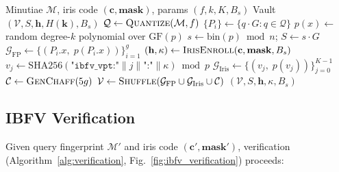 \documentclass[conference]{IEEEtran}
\newcommand{\IBFV}{\textsf{IBFV}}
\newcommand{\GFp}{\mathrm{GF}(p)}
\begin{document}
\begin{algorithm}[t]
\caption{\IBFV{} Enrollment}
\label{alg:enrollment}
\begin{algorithmic}[1]
\REQUIRE Minutiae $\mathcal{M}$, iris code $(\mathbf{c}, \mathbf{mask})$, params $(f, k, K, B_s)$
\ENSURE Vault $(\mathcal{V}, S, \mathbf{h}, H(\mathbf{k}), B_s)$
\STATE $\mathcal{Q} \leftarrow \textsc{Quantize}(\mathcal{M}, f)$
\STATE $\{P_i\} \leftarrow \{q \cdot G : q \in \mathcal{Q}\}$ 
\STATE $p(x) \leftarrow$ random degree-$k$ polynomial over $\GFp{}$
\STATE $s \leftarrow \text{bin}(p) \bmod n$; $S \leftarrow s \cdot G$
\STATE $\mathcal{G}_\text{FP} \leftarrow \{(P_i.x,\; p(P_i.x))\}_{i=1}^{g}$
\STATE $(\mathbf{h}, \kappa) \leftarrow \textsc{IrisEnroll}(\mathbf{c}, \mathbf{mask}, B_s)$
    \STATE $v_j \leftarrow \text{SHA256}(\texttt{"ibfv\_vpt:"} \| j \| \texttt{":"} \| \kappa) \bmod p$
\ENDFOR
\STATE $\mathcal{G}_\text{Iris} \leftarrow \{(v_j,\; p(v_j))\}_{j=0}^{K-1}$
\STATE $\mathcal{C} \leftarrow \textsc{GenChaff}(5g)$ 
\STATE $\mathcal{V} \leftarrow \textsc{Shuffle}(\mathcal{G}_\text{FP} \cup \mathcal{G}_\text{Iris} \cup \mathcal{C})$
\RETURN $(\mathcal{V}, S, \mathbf{h}, \kappa, B_s)$
\end{algorithmic}
\end{algorithm}

\subsection{IBFV Verification}
\label{sec:ibfv_verification}

Given query fingerprint $\mathcal{M}'$ and iris code $(\mathbf{c}', \mathbf{mask}')$, verification (Algorithm~\ref{alg:verification}, Fig.~\ref{fig:ibfv_verification}) proceeds:
\end{document}

